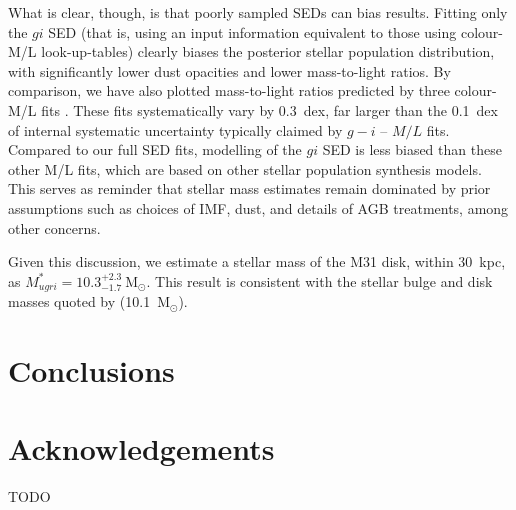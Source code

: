 \documentclass{iau}
\newcommand{\mnras}{MNRAS}       %
\begin{document}
What is clear, though, is that poorly sampled SEDs can bias results.
Fitting only the $gi$ SED (that is, using an input information equivalent to those using colour-M/L look-up-tables) clearly biases the posterior stellar population distribution, with significantly lower dust opacities and lower mass-to-light ratios. 
By comparison, we have also plotted mass-to-light ratios predicted by three colour-M/L fits \citep{Zibetti:2009,Taylor:2011,Into:2013}.
These fits systematically vary by 0.3~dex, far larger than the 0.1~dex of internal systematic uncertainty typically claimed by $g-i$ -- $M/L$ fits. 
Compared to our full SED fits, modelling of the $gi$ SED is less biased than these other M/L fits, which are based on other stellar population synthesis models.
This serves as reminder that stellar mass estimates remain dominated by prior assumptions such as choices of IMF, dust, and details of AGB treatments, among other concerns.

Given this discussion, we estimate a stellar mass of the M31 disk, within $30$~kpc, as $M_{ugri}^{*} = 10.3^{+2.3}_{-1.7}~\mathrm{M}_\odot$.
This result is consistent with the stellar bulge and disk masses quoted by \cite{Tamm:2012} (10.1~$\mathrm{M}_\odot$).

\section{Conclusions}


\section*{Acknowledgements}

\noindent TODO





\end{document}

